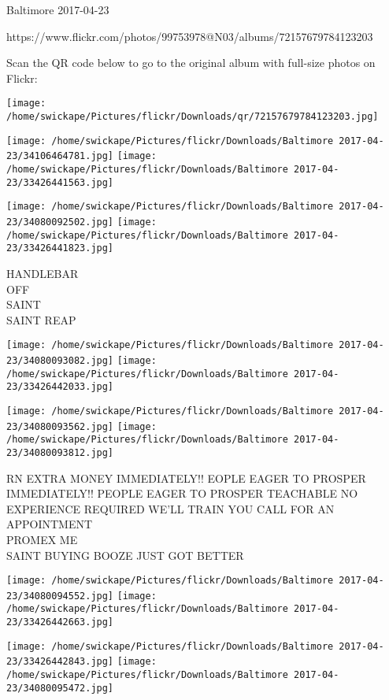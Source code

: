 \documentclass[10pt,letterpaper]{article}
\begin{document}
Baltimore 2017-04-23

https://www.flickr.com/photos/99753978@N03/albums/72157679784123203

Scan the QR code below to go to the original album with full-size photos on Flickr:

\texttt{[image: /home/swickape/Pictures/flickr/Downloads/qr/72157679784123203.jpg]}
\pagebreak

\texttt{[image: /home/swickape/Pictures/flickr/Downloads/Baltimore 2017-04-23/34106464781.jpg]}
\texttt{[image: /home/swickape/Pictures/flickr/Downloads/Baltimore 2017-04-23/33426441563.jpg]}

\texttt{[image: /home/swickape/Pictures/flickr/Downloads/Baltimore 2017-04-23/34080092502.jpg]}
\texttt{[image: /home/swickape/Pictures/flickr/Downloads/Baltimore 2017-04-23/33426441823.jpg]}

HANDLEBAR\\
OFF\\
SAINT\\
SAINT REAP\\
\pagebreak

\texttt{[image: /home/swickape/Pictures/flickr/Downloads/Baltimore 2017-04-23/34080093082.jpg]}
\texttt{[image: /home/swickape/Pictures/flickr/Downloads/Baltimore 2017-04-23/33426442033.jpg]}

\texttt{[image: /home/swickape/Pictures/flickr/Downloads/Baltimore 2017-04-23/34080093562.jpg]}
\texttt{[image: /home/swickape/Pictures/flickr/Downloads/Baltimore 2017-04-23/34080093812.jpg]}

RN EXTRA MONEY IMMEDIATELY!! EOPLE EAGER TO PROSPER\\
IMMEDIATELY!!  PEOPLE EAGER TO PROSPER TEACHABLE NO EXPERIENCE REQUIRED WE'LL TRAIN YOU CALL FOR AN APPOINTMENT\\
PROMEX ME\\
SAINT BUYING BOOZE JUST GOT BETTER\\
\pagebreak

\texttt{[image: /home/swickape/Pictures/flickr/Downloads/Baltimore 2017-04-23/34080094552.jpg]}
\texttt{[image: /home/swickape/Pictures/flickr/Downloads/Baltimore 2017-04-23/33426442663.jpg]}

\texttt{[image: /home/swickape/Pictures/flickr/Downloads/Baltimore 2017-04-23/33426442843.jpg]}
\texttt{[image: /home/swickape/Pictures/flickr/Downloads/Baltimore 2017-04-23/34080095472.jpg]}
\end{document}
